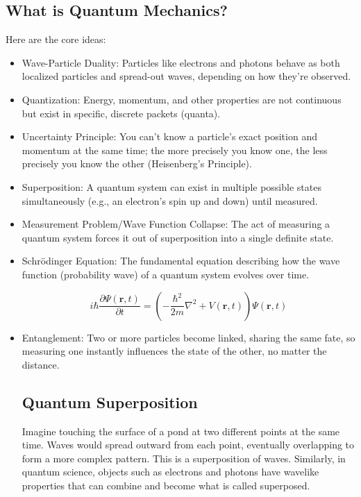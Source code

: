\documentclass[17pt,a4paper]{extarticle}
\begin{document}
\subsection{What is Quantum Mechanics?}
Here are the core ideas:
\begin{itemize}
  \item Wave-Particle Duality: Particles like electrons and photons behave as both localized particles and spread-out waves, depending on how they're observed. 
  \item Quantization: Energy, momentum, and other properties are not continuous but exist in specific, discrete packets (quanta).
  \item Uncertainty Principle: You can't know a particle's exact position and momentum at the same time; the more precisely you know one, the less precisely you know the other (Heisenberg's Principle).
  \item Superposition: A quantum system can exist in multiple possible states simultaneously (e.g., an electron's spin up and down) until measured.
  \item Measurement Problem/Wave Function Collapse: The act of measuring a quantum system forces it out of superposition into a single definite state.
  \item Schrödinger Equation: The fundamental equation describing how the wave function (probability wave) of a quantum system evolves over time. 

\begin{equation*}
i\hbar \frac{\partial \Psi(\mathbf{r},t)}{\partial t}
=
\left(
-\frac{\hbar^2}{2m}\nabla^2 + V(\mathbf{r},t)
\right)
\Psi(\mathbf{r},t)
\end{equation*}


  \item Entanglement: Two or more particles become linked, sharing the same fate, so measuring one instantly influences the state of the other, no matter the distance.

  \subsection{Quantum Superposition}
  Imagine touching the surface of a pond at two different points at the same time. Waves would spread outward from each point, eventually overlapping to form a more complex pattern. This is a superposition of waves. Similarly, in quantum science, objects such as electrons and photons have wavelike properties that can combine and become what is called superposed.


\end{itemize}
\end{document}
